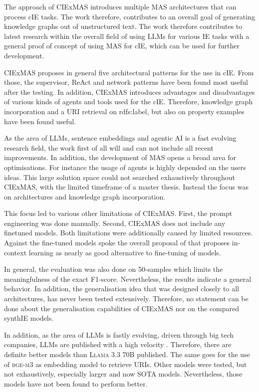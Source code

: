 \documentclass[a4paper,oneside,bibliography=totoc]{scrbook}
\begin{document}
The approach of CIExMAS introduces multiple \ac{MAS} architectures that can process \ac{cIE} tasks. The work therefore, contributes to an overall goal of generating knowledge graphs out of unstructured text. The work therefore contributes to latest research within the overall field of using \acp{LLM} for various \ac{IE} tasks with a general proof of concept of using \ac{MAS} for \ac{cIE}, which can be used for further development.

CIExMAS proposes in general five architectural patterns for the use in \ac{cIE}. From those, the supervisor, ReAct and network patterns have been found most useful after the testing. In addition, CIExMAS introduces advantages and disadvantages of various kinds of agents and tools used for the \ac{cIE}. Therefore, knowledge graph incorporation and a URI retrieval on rdfs:label, but also on property examples have been found useful.

As the area of \acp{LLM}, sentence embeddings and agentic AI is a fast evolving research field, the work first of all will and can not include all recent improvements. In addition, the development of \ac{MAS} opens a broad area for optimisations. For instance the usage of agents is highly depended on the users ideas. This large solution space could not searched exhaustively throughout CIExMAS, with the limited timeframe of a master thesis. Instead the focus was on architectures and knowledge graph incorporation.

This focus led to various other limitations of CIExMAS. First, the prompt engineering was done manually. Second, CIExMAS does not include any finetuned models. Both limitations were additionally caused by limited resources. Against the fine-tuned models spoke the overall proposal of \citet{Brown2020} that proposes in-context learning as nearly as good alternative to fine-tuning of models.

In general, the evaluation was also done on 50-samples which limits the meaningfulness of the exact F1-score. Nevertheless, the results indicate a general behavior. In addition, the generalisation idea that was designed closely to all architectures, has never been tested extensively. Therefore, no statement can be done about the generalisation capabilities of CIExMAS nor on the compared synthIE models.

In addition, as the area of \acp{LLM} is fastly evolving, driven through big tech companies, \acp{LLM} are published with a high velocity \cite{Brown2020,Grattafiori2024,MetaAI2025,Chiang2024}. Therefore, there are definite better models than \textsc{Llama 3.3 70B} published. The same goes for the use of \textsc{bge-m3} as embedding model to retrieve \acp{URI}. Other models were tested, but not exhaustively, especially larger and now SOTA models. Nevertheless, those models have not been found to perform better.
\end{document}

